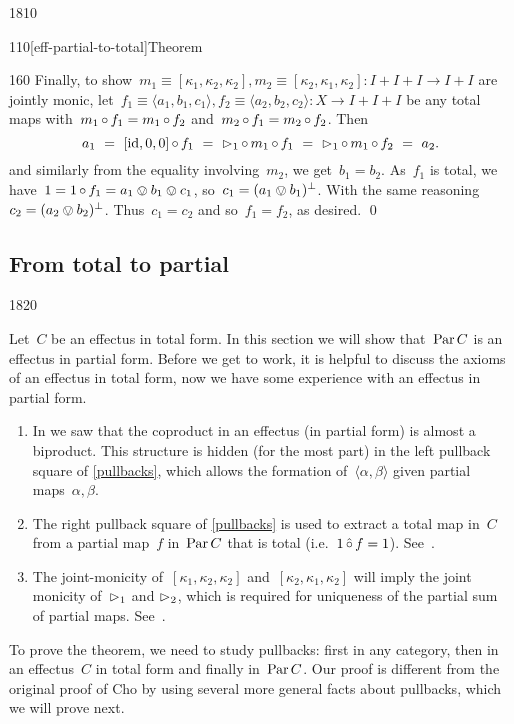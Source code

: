 \begin{parsec}{1810}
\begin{point}{110}[eff-partial-to-total]{Theorem}
\begin{point}{160}
    Finally, to show~$m_1\equiv [\kappa_1,\kappa_2,\kappa_2],
        m_2 \equiv [\kappa_2,\kappa_1,\kappa_2]\colon
    I+I+I \to I+I$ are jointly monic,
    let~$f_1 \equiv \langle a_1,b_1,c_1\rangle,f_2\equiv \langle a_2,b_2,c_2\rangle\colon X\to I+I+I$ be any total maps
    with~$m_1 \mathop{\circ} f_1 = m_1 \mathop{\circ} f_2$
    and~$m_2 \mathop{\circ} f_1 = m_2 \mathop{\circ} f_2$.
Then
\begin{equation*}
    a_1 \ = \ [\mathrm{id}, 0, 0] \mathop{\circ} f_1
        \ = \ \mathord{\vartriangleright}_1 \mathop{\circ} m_1 \mathop{\circ} f_1
        \ = \ \mathord{\vartriangleright}_1 \mathop{\circ} m_1 \mathop{\circ} f_2
        \ = \ a_2.
\end{equation*}
and similarly from the equality involving~$m_2$, we get~$b_1 = b_2$.
As~$f_1$ is total, we have~$1 = 1 \mathop{\circ} f_1=  a_1 \ovee b_1 \ovee c_1$,
    so~$c_1 = (a_1 \ovee b_1)^\perp$.
With the same reasoning~$c_2 = (a_2 \ovee b_2)^\perp$.
Thus~$c_1 = c_2$ and so~$f_1 = f_2$, as desired. \qed
\end{point}
\end{point}
\end{parsec}

\subsection{From total to partial}
\begin{parsec}{1820}%
\begin{point}{10}%
Let~$C$ be an effectus in total form.
In this section we will show that~$\operatorname{Par} C$ is an effectus in partial form.
Before we get to work, it is helpful to discuss the axioms
    of an effectus in total form, now we have some experience
    with an effectus in partial form.
\begin{enumerate}
\item
In  we saw that the coproduct in an effectus
    (in partial form) is almost a biproduct.
This structure is hidden (for the most part)
    in the left pullback square of
    \eqref{pullbacks}, which
    allows the formation of~$\langle \alpha, \beta \rangle$ given
    partial maps~$\alpha,\beta$.
\item
The right pullback square of \eqref{pullbacks}
    is used to extract a total map in~$C$
    from a partial map~$f$ in~$\operatorname{Par} C$ that is total (i.e.~$1 \mathop{\hat\circ} f = 1$).
        See~.
\item
The joint-monicity
    of~$[\kappa_1,\kappa_2,\kappa_2]$
    and~$[\kappa_2,\kappa_1,\kappa_2]$
    will imply the joint monicity of~$\mathord{\vartriangleright}_1$ and $\mathord{\vartriangleright}_2$,
    which is required for uniqueness of the partial sum of partial maps.
        See~.
\end{enumerate}
To prove the theorem, we need to study pullbacks:
    first in any category,
    then in an effectus~$C$ in total form
    and finally in~$\operatorname{Par} C$.
Our proof is different from the original proof of Cho
    by using several more general facts about pullbacks,
    which we will prove next.
\end{point}
\end{parsec}

